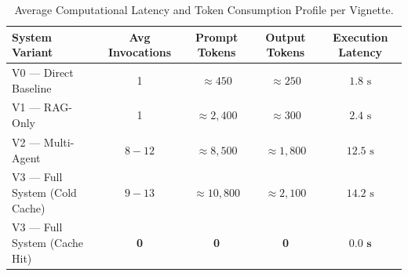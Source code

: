 \begin{table}[h!]
\centering
\caption{Average Computational Latency and Token Consumption Profile per Vignette.}
\label{tab:token_latency}
\small
\begin{tabularx}{\textwidth}{l c c c c}
\toprule
\textbf{System Variant} & \textbf{Avg Invocations} & \textbf{Prompt Tokens} & \textbf{Output Tokens} & \textbf{Execution Latency} \\
\midrule
V0 — Direct Baseline & 1 & $\approx 450$ & $\approx 250$ & $1.8\text{ s}$ \\
V1 — RAG-Only & 1 & $\approx 2,400$ & $\approx 300$ & $2.4\text{ s}$ \\
V2 — Multi-Agent & $8 - 12$ & $\approx 8,500$ & $\approx 1,800$ & $12.5\text{ s}$ \\
V3 — Full System (Cold Cache) & $9 - 13$ & $\approx 10,800$ & $\approx 2,100$ & $14.2\text{ s}$ \\
V3 — Full System (Cache Hit) & \textbf{0} & \textbf{0} & \textbf{0} & $\mathbf{0.0\text{ s}}$ \\
\bottomrule
\end{tabularx}
\end{table}
